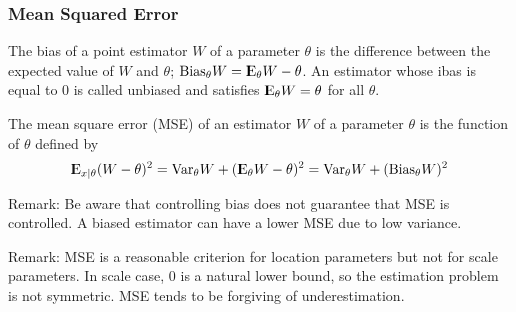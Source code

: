 \documentclass[12pt]{article}
\begin{document}
\subsubsection*{Mean Squared Error}
\begin{definition}
	The bias of a point estimator $W$ of a parameter $\theta$ is the difference between the expected value of $W$ and $\theta$; $\mathrm{Bias}_{\theta} W = {\rm I\kern-.3em E}_{\theta} W - \theta$. An estimator whose ibas is equal to 0 is called unbiased and satisfies ${\rm I\kern-.3em E}_{\theta}W = \theta$ for all $\theta$.
\end{definition}
\begin{definition}
	The mean square error (MSE) of an estimator $W$ of a parameter $\theta$ is the function of $\theta$ defined by  $${\rm I\kern-.3em E}_{x|\theta}(W - \theta)^2 = \mathrm{Var}_{\theta} W + ({\rm I\kern-.3em E}_{\theta}W - \theta )^2 = \mathrm{Var}_{\theta} W + (\mathrm{Bias}_{\theta}W)^2$$
\end{definition}

Remark: Be aware that controlling bias does not guarantee that MSE is controlled. A biased estimator can have a lower MSE due to low variance.

Remark: MSE is a reasonable criterion for location parameters but not for scale parameters. In scale case, 0 is a natural lower bound, so the estimation problem is not symmetric. MSE tends to be forgiving of underestimation.
\end{document}
